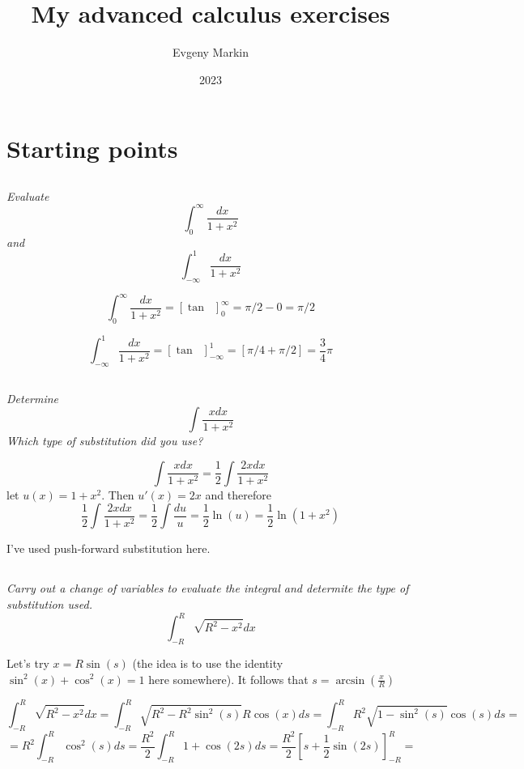 \documentclass[11pt,oneside,titlepage]{book}
\title{My advanced calculus exercises}
\author{Evgeny Markin}
\date{2023}
\DeclareMathOperator \inv {^{-1}}
\begin{document}
\maketitle
\tableofcontents


\chapter{Starting points}

\section{}

\textit{Evaluate }
$$\int_0^\infty{\frac{dx}{1 + x^2}}$$
\textit{and}
$$\int_{-\infty}^1{\frac{dx}{1 + x^2}}$$

$$\int_0^\infty{\frac{dx}{1 + x^2}} = [\tan \inv]_0^\infty = \pi/2 - 0 = \pi/2 $$

$$\int_{-\infty}^1{\frac{dx}{1 + x^2}} = [\tan \inv]_{-\infty}^1 = [\pi/4 + \pi/2] = \frac{3}{4} \pi$$


\section{}

\textit{Determine}
$$\int{\frac {x dx}{1 + x^2}}$$
\textit{Which type of substitution did you use?}

$$\int{\frac {x dx}{1 + x^2}} = \frac 1 2 \int{ \frac {2 x  dx}{1 + x^2}}$$
let $u(x) = 1 + x^2$. Then $u'(x) = 2x$ and therefore
$$\frac 1 2 \int{ \frac {2 x  dx}{1 + x^2}} =
\frac 1 2 \int{ \frac {du}{u}} = \frac{1}{2} \ln(u) = \frac{1}{2} \ln(1 + x^2)$$

I've used push-forward substitution here.

\section{}

\textit{Carry out a change of variables to evaluate the integral and determite the type
of substitution used.}
$$\int_{-R}^{R}{\sqrt{R^2 - x^2}dx}$$



Let's try $x = R \sin(s)$ (the idea is to use the identity $\sin^2(x) + \cos^2(x) = 1$ here
somewhere). It follows that $s = \arcsin(\frac{x}{R})$



$$\int_{-R}^{R}{\sqrt{R^2 - x^2}dx} =
\int_{-R}^{R}{\sqrt{R^2 - R^2 \sin^2(s)} R\cos(x) ds} =
\int_{-R}^{R}{R^2 \sqrt{1 -  \sin^2(s)} \cos(s) ds} =$$
$$ = 
R^2  \int_{-R}^{R}{\cos^2(s) ds} =
\frac{R^2}{2}  \int_{-R}^{R}{1 + \cos(2s)  ds} =
\frac{R^2}{2}\left[s + \frac{1}{2} \sin(2s)\right]_{-R}^R
=
$$
\end{document}

